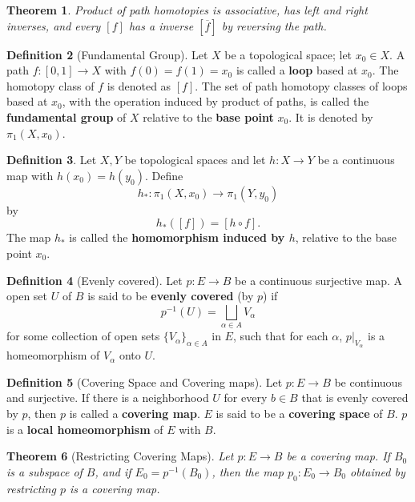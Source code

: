 \documentclass{amsart}
\newtheorem{theorem}{Theorem}[section]
\theoremstyle{definition}
\newtheorem{definition}[theorem]{Definition}
\theoremstyle{remark}
\numberwithin{equation}{section}
\newcommand{\dis}{\bigsqcup}
\begin{document}
\begin{theorem}
    Product of path homotopies is associative, has left and right inverses, and every $[f]$ has a inverse $[\overline{f}]$ by reversing the path.
\end{theorem}
\begin{definition}[Fundamental Group] Let $X$ be a topological space; let $x_0 \in X$. A path $f:[0,1] \longrightarrow X$ with $f(0) = f(1) = x_0$ is called a \textbf{loop} based at $x_0$. The homotopy class of $f$ is denoted as $[f]$. The set of path homotopy classes of loops based at $x_0$, with the operation induced by product of paths, is called the \textbf{fundamental group} of $X$ relative to the \textbf{base point} $x_0$. It is denoted by $\pi_1(X, x_0)$.
\end{definition}

\begin{definition} Let $X,Y$ be topological spaces and let $h : X \to Y$ be a continuous map with $h(x_0) = h(y_0).$ Define
\[
h_\ast : \pi_1(X, x_0) \to \pi_1(Y, y_0)
\]
by
\[
h_\ast([f]) = [h \circ f].
\]
The map $h_\ast$ is called the \textbf{homomorphism induced by $h$}, relative to the base point $x_0$.

\end{definition}

\begin{definition}[Evenly covered] Let $p : E \to B$ be a continuous surjective map. A open set $U$ of $B$ is said to be \textbf{evenly covered} (by $p$) if
$$p^{-1}(U) = \dis_{\alpha \in A} V_\alpha$$
for some collection of open sets $\{V_\alpha\}_{\alpha \in A}$ in $E$, such that for each $\alpha$, $p |_{V_\alpha}$ is a homeomorphism of $V_\alpha$ onto $U$.
\end{definition}

\begin{definition}[Covering Space and Covering maps] \label{GLCT} Let $p : E \to B$ be continuous and surjective. If there is a neighborhood $U$ for every $b \in B$ that is evenly covered by $p$, then $p$ is called a \textbf{covering map}. $E$ is said to be a \textbf{covering space} of $B$. $p$ is a \textbf{local homeomorphism} of $E$ with $B$.   
\end{definition}

\begin{theorem} [Restricting Covering Maps] \label{Restrict} Let $p : E \to B$ be a covering map. If $B_0$ is a subspace of $B$, and if $E_0 = p^{-1}(B_0)$, then the map $p_0 : E_0 \to B_0$ obtained by restricting $p$ is a covering map.

\end{theorem}
\end{document}
